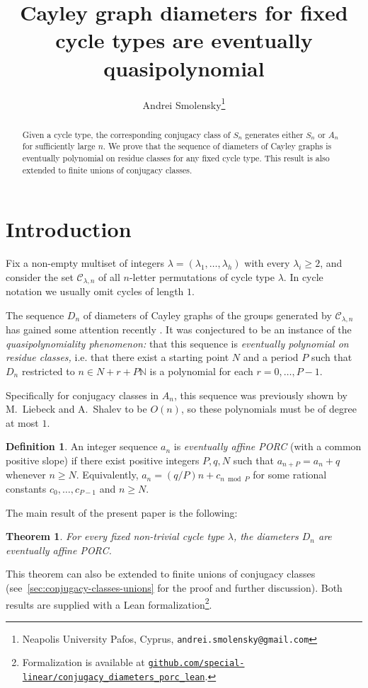 \documentclass[DIV=12,10pt]{scrartcl}
\title{Cayley graph diameters for fixed cycle types are eventually quasipolynomial}
\author{Andrei Smolensky\thanks{Neapolis University Pafos, Cyprus, \texttt{andrei.smolensky@gmail.com}}}
\newtheorem{theorem}{Theorem}
\theoremstyle{definition}
\newtheorem{definition}{Definition}
\newcommand{\cc}{\mathcal{C}}
\begin{document}
\maketitle

\begin{abstract}
Given a cycle type, the corresponding conjugacy class of $S_n$ generates either $S_n$ or $A_n$ for sufficiently large $n$. We prove that the sequence of diameters of Cayley graphs is eventually polynomial on residue classes for any fixed cycle type. This result is also extended to finite unions of conjugacy classes.
\end{abstract}


\section*{Introduction}

Fix a non-empty multiset of integers $\lambda = (\lambda_1,\ldots,\lambda_h)$ with every $\lambda_i\geqslant 2$, and consider the set $\cc_{\lambda,n}$ of all $n$-letter permutations of cycle type $\lambda$. In cycle notation we usually omit cycles of length $1$.

The sequence $D_n$ of diameters of Cayley graphs of the groups generated by $\cc_{\lambda,n}$ has gained some attention recently \cite{MO512777}. It was conjectured to be an instance of the \emph{quasipolynomiality phenomenon:} that this sequence is \emph{eventually polynomial on residue classes,} i.e. that there exist a starting point $N$ and a period $P$ such that $D_n$ restricted to $n\in N+r+P\mathbb{N}$ is a polynomial for each $r=0,\ldots,P-1$.

Specifically for conjugacy classes in $A_n$, this sequence was previously shown by M.~Liebeck and A.~Shalev \cite[Lemma~3.2]{LiebeckShalevDiametersSharpBounds} to be $O(n)$, so these polynomials must be of degree at most $1$.

\begin{definition}
An integer sequence $a_n$ is \emph{eventually affine PORC} (with a common positive slope) if there exist positive integers $P,q,N$ such that $a_{n+P} = a_n+q$ whenever $n\geqslant N$. Equivalently, $a_n = (q/P)n + c_{n \bmod P}$ for some rational constants $c_0,\ldots,c_{P-1}$ and $n\geqslant N$.
\end{definition}

The main result of the present paper is the following:
\begin{theorem}
	\label{thm:diameters-affine-porc}
	For every fixed non-trivial cycle type $\lambda$, the diameters $D_n$ are eventually affine PORC.
\end{theorem}
This theorem can also be extended to finite unions of conjugacy classes (see~\cref{sec:conjugacy-classes-unions} for the proof and further discussion). Both results are supplied with a Lean formalization\footnote{Formalization is available at \href{https://github.com/special-linear/conjugacy_diameters_porc_lean}{\texttt{github.com/special-linear/conjugacy\_diameters\_porc\_lean}}.}.
\end{document}
